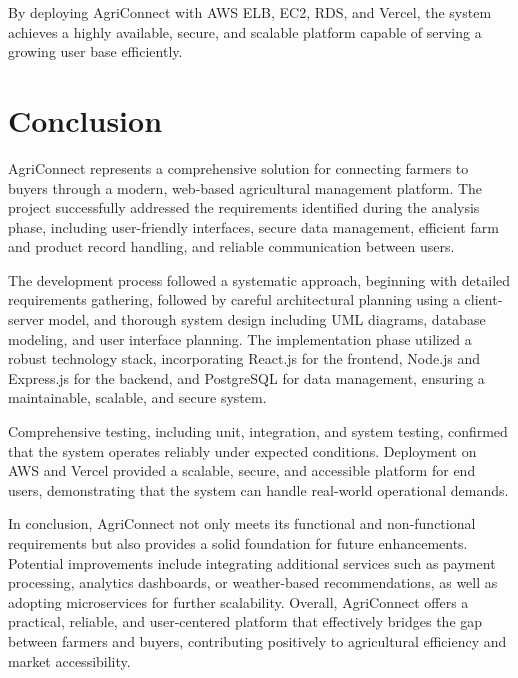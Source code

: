 \documentclass[12pt,a4paper]{article}
\begin{document}
By deploying AgriConnect with AWS ELB, EC2, RDS, and Vercel, the system achieves a highly available, secure, and scalable platform capable of serving a growing user base efficiently.


\section{Conclusion}

AgriConnect represents a comprehensive solution for connecting farmers to buyers through a modern, web-based agricultural management platform. The project successfully addressed the requirements identified during the analysis phase, including user-friendly interfaces, secure data management, efficient farm and product record handling, and reliable communication between users.

The development process followed a systematic approach, beginning with detailed requirements gathering, followed by careful architectural planning using a client-server model, and thorough system design including UML diagrams, database modeling, and user interface planning. The implementation phase utilized a robust technology stack, incorporating React.js for the frontend, Node.js and Express.js for the backend, and PostgreSQL for data management, ensuring a maintainable, scalable, and secure system.

Comprehensive testing, including unit, integration, and system testing, confirmed that the system operates reliably under expected conditions. Deployment on AWS and Vercel provided a scalable, secure, and accessible platform for end users, demonstrating that the system can handle real-world operational demands.

In conclusion, AgriConnect not only meets its functional and non-functional requirements but also provides a solid foundation for future enhancements. Potential improvements include integrating additional services such as payment processing, analytics dashboards, or weather-based recommendations, as well as adopting microservices for further scalability. Overall, AgriConnect offers a practical, reliable, and user-centered platform that effectively bridges the gap between farmers and buyers, contributing positively to agricultural efficiency and market accessibility.
\end{document}
